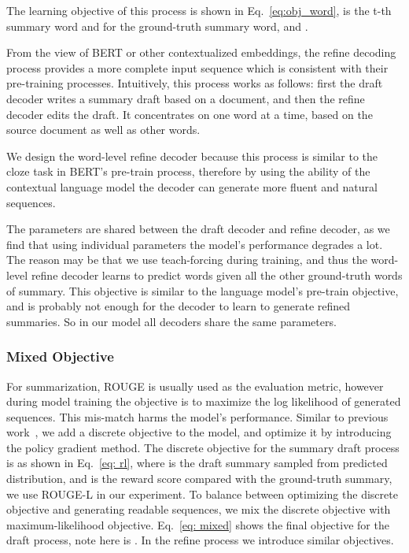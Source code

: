 \documentclass{article}
\begin{document}
The learning objective of this process is shown in Eq.~\eqref{eq:obj_word},  is the t-th summary word and  for the ground-truth summary word, and .



From the view of BERT or other contextualized embeddings, the refine decoding process provides a more complete input sequence which is consistent with their pre-training processes. Intuitively, this process works as follows: first the draft decoder writes a summary draft based on a document, and then the refine decoder edits the draft. It concentrates on one word at a time, based on the source document as well as other words.

We design the word-level refine decoder because this process is similar to the cloze task in BERT's pre-train process, therefore by using the ability of the contextual language model the decoder can generate more fluent and natural sequences.

The parameters are shared between the draft decoder and refine decoder, as we find that using individual parameters the model's performance degrades a lot. The reason may be that we use teach-forcing during training, and thus the word-level refine decoder learns to predict words given all the other ground-truth words of summary. This objective is similar to the language model's pre-train objective, and is probably not enough for the decoder to learn to generate refined summaries. So in our model all decoders share the same parameters.

\subsubsection{Mixed Objective}

For summarization, ROUGE is usually used as the evaluation metric, however during model training the objective is to maximize the log likelihood of generated sequences. This mis-match harms the model's performance. Similar to previous work~\cite{kryscinski2018improving}, we add a discrete objective to the model, and optimize it by introducing the policy gradient method. The discrete objective for the summary draft process is as shown in Eq.~\eqref{eq: rl}, where  is the draft summary sampled from predicted distribution, and  is the reward score compared with the ground-truth summary, we use ROUGE-L in our experiment. To balance between optimizing the discrete objective and generating readable sequences, we mix the discrete objective with maximum-likelihood objective. Eq.~\eqref{eq: mixed} shows the final objective for the draft process, note here  is . In the refine process we introduce similar objectives. 
\end{document}
